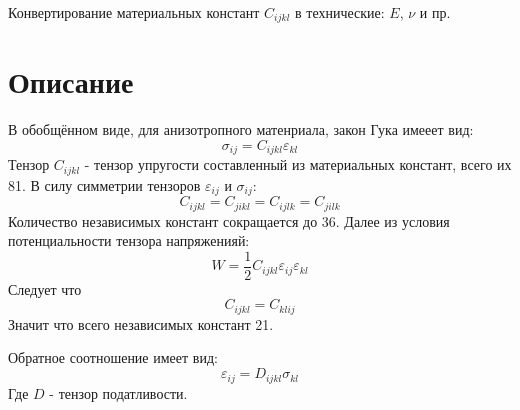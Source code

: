 \documentclass[a4paper,12pt]{article}
\begin{document}
{~}\bigskip
\begin{center}
    \Huge{Конвертирование материальных констант $C_{ijkl}$ в технические: $E$, $\nu$ и пр.}
\end{center}

\section{Описание}
В обобщённом виде, для анизотропного матенриала, закон Гука имееет вид:
\begin{equation}
    \label{eq1}
    \sigma_{ij} = C_{ijkl}\varepsilon_{kl}
\end{equation}
Тензор $C_{ijkl}$ - тензор упругости составленный из материальных констант, всего их 81.
В силу симметрии тензоров $\varepsilon_{ij}$ и $\sigma_{ij}$:
$$
C_{ijkl} = C_{jikl} = C_{ijlk} = C_{jilk} 
$$
Количество независимых констант сокращается до 36. Далее из условия потенциальности тензора напряженияй:
$$
W=\frac{1}{2}C_{ijkl}\varepsilon_{ij}\varepsilon_{kl}
$$
Следует что 
$$
C_{ijkl} = C_{klij}
$$
Значит что всего независимых констант 21.

Обратное соотношение имеет вид:
$$
\varepsilon_{ij} = D_{ijkl}\sigma_{kl}
$$
Где $D$ - тензор податливости.
\end{document}
